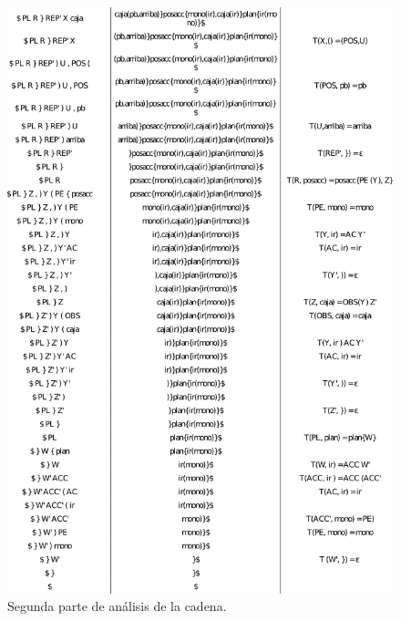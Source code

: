 \documentclass[11pt,a4paper,spanish,twoside]{book}
\theoremstyle{plain} \newtheorem{nota}{Nota}
\begin{document}
\begin{figure}
  \centering
    \includegraphics[width=\linewidth]{img/palabra2.pdf}
  \caption{Segunda parte de análisis de la cadena.}
  \label{ana2}
\end{figure}
\end{document}

